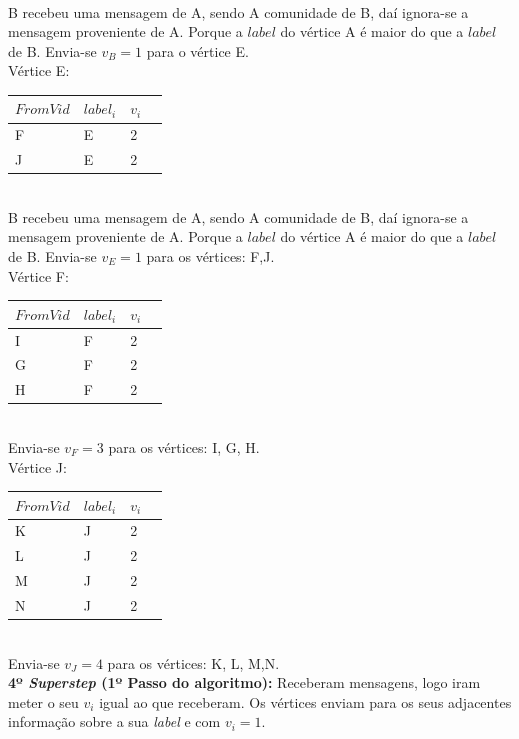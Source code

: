 \documentclass[a4paper,10pt]{report}
\begin{document}
\\[0.25cm]
  B recebeu uma mensagem de A, sendo A comunidade de B, daí ignora-se a mensagem 
proveniente de A. Porque a $label$ do vértice A é maior do que a $label$ 
de B.
  Envia-se $v_B = 1$ para o vértice E.
\\[0.25cm]
Vértice E:
  \begin{tabular}{| l | l | l | l |}
  \hline
  $From Vid$ & $label_i$ & $v_i$ \\ \hline
  F & E & 2 \\ \hline
  J & E & 2 \\ \hline
  \end{tabular}  
\\[0.25cm]
  B recebeu uma mensagem de A, sendo A comunidade de B, daí ignora-se a 
mensagem 
proveniente de A. Porque a $label$ do vértice A é maior do que a $label$ 
de B.
  Envia-se $v_E = 1$ para os vértices: F,J.
\\[0.25cm]
Vértice F:
  \begin{tabular}{| l | l | l | l |}
  \hline
  $From Vid$ & $label_i$ & $v_i$ \\ \hline
  I & F & 2 \\ \hline
  G & F & 2 \\ \hline
  H & F & 2 \\ \hline
  \end{tabular}  
\\[0.25cm]
  Envia-se $v_F = 3$ para os vértices: I, G, H.
\\[0.25cm]
Vértice J:
  \begin{tabular}{| l | l | l | l |}
  \hline
  $From Vid$ & $label_i$ & $v_i$ \\ \hline
  K & J & 2 \\ \hline
  L & J & 2 \\ \hline
  M & J & 2 \\ \hline
  N & J & 2 \\ \hline
  \end{tabular}  
\\[0.25cm]
  Envia-se $v_J = 4$ para os vértices: K, L, M,N.
\\[0.25cm]
{\bf 4º \textit{Superstep} (1º Passo do algoritmo):}
Receberam mensagens, logo iram meter o seu $v_i$ igual ao que receberam.
Os vértices enviam para os seus adjacentes 
informação sobre a sua \textit{label} e com $v_i=1$.
\end{document}
